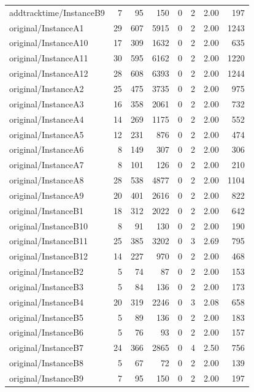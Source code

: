 \begin{tabular}{lrrrrrrr}
addtracktime/InstanceB9 & 7 & 95 & 150 & 0 & 2 & 2.00 & 197 \\
original/InstanceA1 & 29 & 607 & 5915 & 0 & 2 & 2.00 & 1243 \\
original/InstanceA10 & 17 & 309 & 1632 & 0 & 2 & 2.00 & 635 \\
original/InstanceA11 & 30 & 595 & 6162 & 0 & 2 & 2.00 & 1220 \\
original/InstanceA12 & 28 & 608 & 6393 & 0 & 2 & 2.00 & 1244 \\
original/InstanceA2 & 25 & 475 & 3735 & 0 & 2 & 2.00 & 975 \\
original/InstanceA3 & 16 & 358 & 2061 & 0 & 2 & 2.00 & 732 \\
original/InstanceA4 & 14 & 269 & 1175 & 0 & 2 & 2.00 & 552 \\
original/InstanceA5 & 12 & 231 & 876 & 0 & 2 & 2.00 & 474 \\
original/InstanceA6 & 8 & 149 & 307 & 0 & 2 & 2.00 & 306 \\
original/InstanceA7 & 8 & 101 & 126 & 0 & 2 & 2.00 & 210 \\
original/InstanceA8 & 28 & 538 & 4877 & 0 & 2 & 2.00 & 1104 \\
original/InstanceA9 & 20 & 401 & 2616 & 0 & 2 & 2.00 & 822 \\
original/InstanceB1 & 18 & 312 & 2022 & 0 & 2 & 2.00 & 642 \\
original/InstanceB10 & 8 & 91 & 130 & 0 & 2 & 2.00 & 190 \\
original/InstanceB11 & 25 & 385 & 3202 & 0 & 3 & 2.69 & 795 \\
original/InstanceB12 & 14 & 227 & 970 & 0 & 2 & 2.00 & 468 \\
original/InstanceB2 & 5 & 74 & 87 & 0 & 2 & 2.00 & 153 \\
original/InstanceB3 & 5 & 84 & 136 & 0 & 2 & 2.00 & 173 \\
original/InstanceB4 & 20 & 319 & 2246 & 0 & 3 & 2.08 & 658 \\
original/InstanceB5 & 5 & 89 & 136 & 0 & 2 & 2.00 & 183 \\
original/InstanceB6 & 5 & 76 & 93 & 0 & 2 & 2.00 & 157 \\
original/InstanceB7 & 24 & 366 & 2865 & 0 & 4 & 2.50 & 756 \\
original/InstanceB8 & 5 & 67 & 72 & 0 & 2 & 2.00 & 139 \\
original/InstanceB9 & 7 & 95 & 150 & 0 & 2 & 2.00 & 197 \\
\bottomrule
\end{tabular}

